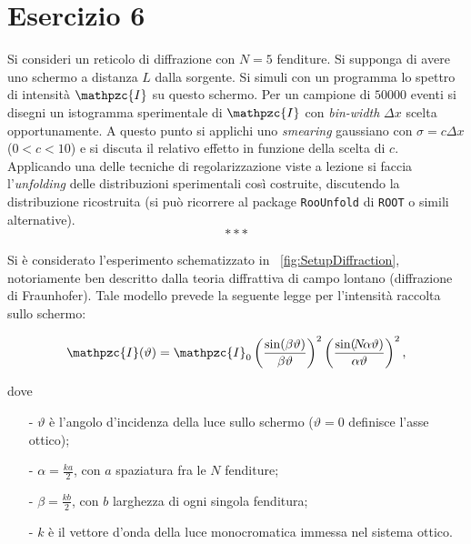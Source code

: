 \section{Esercizio 6}

Si consideri un reticolo di diffrazione con $N=5$ fenditure. Si supponga di avere uno schermo a distanza $L$ dalla sorgente. Si simuli con un programma lo spettro di intensità $\mathpzc{I}$ su questo schermo. Per un campione di $50000$ eventi si disegni un istogramma sperimentale di $\mathpzc{I}$ con \textsl{bin-width} $\Delta x$ scelta opportunamente. A questo punto si applichi uno \textsl{smearing} gaussiano con $\sigma =c\Delta x$ ($0<c<10$) e si discuta il relativo effetto in funzione della scelta di $c$. Applicando una delle tecniche di regolarizzazione viste a lezione si faccia l'\textsl{unfolding} delle distribuzioni sperimentali così costruite, discutendo la distribuzione ricostruita (si può ricorrere al package \texttt{RooUnfold} di \texttt{ROOT} o simili alternative).\\

\[* * * \] \medskip

\noindent Si è considerato l'esperimento schematizzato in \figurename~\ref{fig:SetupDiffraction}, notoriamente ben descritto dalla teoria diffrattiva di campo lontano ({diffrazione di Fraunhofer}). Tale modello prevede la seguente legge per l'intensità raccolta sullo schermo:

\begin{equation}
\mathpzc{I}(\vartheta) = \mathpzc{I}_0 \left(\frac{\sin(\beta\vartheta)}{\beta\vartheta}\right)^2\left(\frac{\sin (\!N\!\alpha \vartheta)}{\alpha\vartheta}\right)^2,
\label{eq:Fraunhofer}
\end{equation}

\noindent dove

\begin{itemize}
	\item[-] $\vartheta$ è l'angolo d'incidenza della luce sullo schermo ($\vartheta = 0$ definisce l'asse ottico);
	\item[-] $\alpha = \frac{ka}{2}$, con $a$ spaziatura fra le $N$ fenditure;
	\item[-] $\beta = \frac{kb}{2}$, con $b$ larghezza di ogni singola fenditura;
	\item[-] $k$ è il vettore d'onda della luce monocromatica immessa nel sistema ottico.\\
\end{itemize}

\vfill

